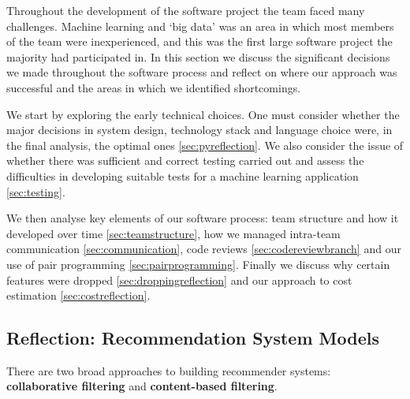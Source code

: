 \documentclass{l3proj}
\begin{document}
Throughout the development of the software project the team faced many challenges. Machine learning and ‘big data’ was an area in which most members of the team were inexperienced, and this was the first large software project the majority had participated in. In this section we discuss the significant decisions we made throughout the software process and reflect on where our approach was successful and the areas in which we identified shortcomings. 

We start by exploring the early technical choices. One must consider whether the major decisions in system design, technology stack and language choice were, in the final analysis, the optimal ones \ref{sec:pyreflection}. We also consider the issue of whether there was sufficient and correct testing carried out and assess the difficulties in developing suitable tests for a machine learning application \ref{sec:testing}.

We then analyse key elements of our software process: team structure and how it developed over time \ref{sec:teamstructure}, how we managed intra-team communication  \ref{sec:communication}, code reviews \ref{sec:codereviewbranch} and our use of pair programming \ref{sec:pairprogramming}. Finally we discuss why certain features were dropped \ref{sec:droppingreflection} and our approach to cost estimation \ref{sec:costreflection}.

\subsection{Reflection: Recommendation System Models}
\label{sec:modelreflection}

There are two broad approaches to building recommender systems: \textbf{collaborative filtering} and \textbf{content-based filtering}. 
\end{document}

